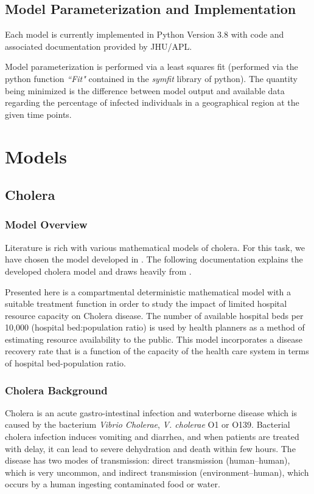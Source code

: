 \documentclass[letter,12pt, usenames,dvipsnames]{article}
\newcommand{\MYhref}[3][Blue]{\href{#2}{\color{#1}{#3}}}
\begin{document}
\subsection{Model Parameterization and Implementation}
\label{sec:Parameterization}
Each model is currently implemented in Python Version 3.8 with code and associated documentation provided by JHU/APL.

Model parameterization is performed via a least squares fit (performed via the python function \textit{``Fit"} contained in the \textit{symfit} library of python).  The quantity being minimized is the difference between model output and available data regarding the percentage of infected individuals in a geographical region at the given time points.


\section{Models}
\subsection{Cholera}
\label{sec:cholera}
\subsubsection{Model Overview}
Literature is rich with various mathematical models of cholera.  For this task, we have chosen the model developed in {
\MYhref{https://www.ncbi.nlm.nih.gov/pmc/articles/PMC6676578/pdf/13104_2019_Article_4504.pdf}{Nyabadza et al}} \cite{cholera}.  The following documentation explains the developed cholera model and draws heavily from \cite{cholera}.

Presented here is a compartmental deterministic
mathematical model with a suitable treatment function
in order to study the impact of limited hospital resource
capacity on Cholera disease. The number of available
hospital beds per 10,000 (hospital bed:population ratio)
is used by health planners as a method of estimating
resource availability to the public. This model incorporates a disease recovery rate that is a function of the capacity of the health care system in terms of hospital bed-population ratio.

\subsubsection{Cholera Background}
 Cholera is an acute gastro-intestinal infection and waterborne disease which is caused by the bacterium \textit{Vibrio
Cholerae}, \textit{V. cholerae} O1 or O139. Bacterial cholera infection induces vomiting and diarrhea, and when patients are treated with delay, it can lead to severe dehydration and death within few hours. The disease has two modes
of transmission: direct transmission (human–human), which is very uncommon, and indirect transmission (environment–human), which occurs by a human ingesting contaminated food or water.
\end{document}
